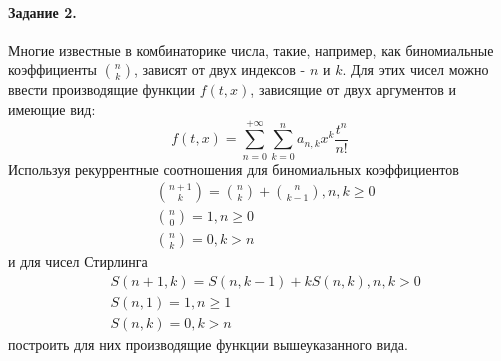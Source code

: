\documentclass[a4paper,12pt]{article}
\begin{document}
\paragraph{Задание 2.} Многие известные в комбинаторике числа, такие, например, как биномиальные коэффициенты $\binom{n}{k}$, зависят от двух индексов - $n$ и $k$. Для этих чисел можно ввести производящие функции $f\left(t,x\right)$, зависящие от двух аргументов и имеющие вид:
\[
	f\left(t,x\right) = \sum_{n=0}^{+\infty}\sum_{k=0}^{n} a_{n,k} x^k \frac{t^n}{n!}
\]
Используя рекуррентные соотношения для биномиальных коэффициентов
\[
	\begin{split}
		& \binom{n+1}{k} = \binom{n}{k} + \binom{n}{k-1}, n,k \ge 0 \\
		& \binom{n}{0} = 1, n \ge 0 \\
		& \binom{n}{k} = 0, k > n
	\end{split}
\]
и для чисел Стирлинга
\[
	\begin{split}
		& S\left(n+1,k\right) = S\left(n,k-1\right) + k S \left(n,k\right), n,k > 0 \\
		& S\left(n,1\right) = 1, n \ge 1 \\
		& S\left(n,k\right) = 0, k > n
	\end{split}
\]
построить для них производящие функции вышеуказанного вида.
\end{document}
